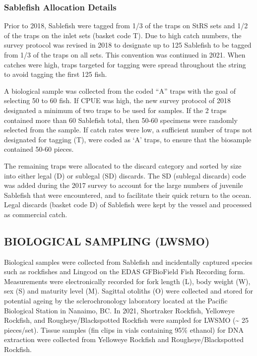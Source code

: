 \documentclass[12pt]{article}\usepackage[]{graphicx}\usepackage[]{color}
\begin{document}
\hypertarget{sablefish-allocation-details}{%
\subsubsection{Sablefish Allocation Details}\label{sablefish-allocation-details}}

Prior to 2018, Sablefish were tagged from 1/3 of the traps on StRS sets and 1/2 of the traps on the inlet sets (basket code T). Due to high catch numbers, the survey protocol was revised in 2018 to designate up to 125 Sablefish to be tagged from 1/3 of the traps on all sets. This convention was continued in 2021. When catches were high, traps targeted for tagging were spread throughout the string to avoid tagging the first 125 fish.

A biological sample was collected from the coded ``A'' traps with the goal of selecting 50 to 60 fish. If CPUE was high, the new survey protocol of 2018 designated a minimum of two traps to be used for samples. If the 2 traps contained more than 60 Sablefish total, then 50-60 specimens were randomly selected from the sample. If catch rates were low, a sufficient number of traps not designated for tagging (T), were coded as `A' traps, to ensure that the biosample contained 50-60 pieces.

The remaining traps were allocated to the discard category and sorted by size into either legal (D) or sublegal (SD) discards. The SD (sublegal discards) code was added during the 2017 survey to account for the large numbers of juvenile Sablefish that were encountered, and to facilitate their quick return to the ocean. Legal discards (basket code D) of Sablefish were kept by the vessel and processed as commercial catch.

\hypertarget{biological-sampling-lwsmo}{%
\subsection{BIOLOGICAL SAMPLING (LWSMO)}\label{biological-sampling-lwsmo}}

Biological samples were collected from Sablefish and incidentally captured species such as rockfishes and Lingcod on the EDAS GFBioField Fish Recording form. Measurements were electronically recorded for fork length (L), body weight (W), sex (S) and maturity level (M). Sagittal otoliths (O) were collected and stored for potential ageing by the sclerochronology laboratory located at the Pacific Biological Station in Nanaimo, BC. In 2021, Shortraker Rockfish, Yelloweye Rockfish, and Rougheye/Blackspotted Rockfish were sampled for LWSMO (\textasciitilde{} 25 pieces/set). Tissue samples (fin clips in vials containing 95\% ethanol) for DNA extraction were collected from Yelloweye Rockfish and Rougheye/Blackspotted Rockfish.
\end{document}
